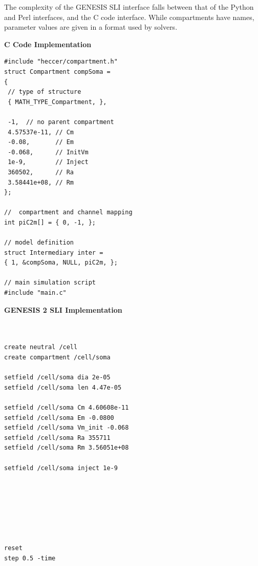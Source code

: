 \documentclass[12pt]{article}
\begin{document}
The complexity of the GENESIS SLI interface falls between that of the
Python and Perl interfaces, and the C code interface.  While compartments have
names, parameter values are given in a format used by solvers.

{\vspace*{3mm} \footnotesize
  \begin{minipage}{1\linewidth}
    
    \begin{minipage}[t]{.50\linewidth}
{\bf C Code Implementation}
\resetlinenumber
\begin{verbatim}
#include "heccer/compartment.h"
struct Compartment compSoma =
{
 // type of structure
 { MATH_TYPE_Compartment, },

 -1,  // no parent compartment
 4.57537e-11, // Cm
 -0.08,       // Em
 -0.068,      // InitVm
 1e-9,        // Inject
 360502,      // Ra
 3.58441e+08, // Rm
};

//  compartment and channel mapping
int piC2m[] = { 0, -1, };

// model definition
struct Intermediary inter =
{ 1, &compSoma, NULL, piC2m, };

// main simulation script
#include "main.c"

\end{verbatim}
    \end{minipage}
    \begin{minipage}[t]{.50\linewidth}
{\bf GENESIS 2 SLI Implementation}
\resetlinenumber
\begin{verbatim}


create neutral /cell
create compartment /cell/soma

setfield /cell/soma dia 2e-05
setfield /cell/soma len 4.47e-05

setfield /cell/soma Cm 4.60608e-11
setfield /cell/soma Em -0.0800
setfield /cell/soma Vm_init -0.068
setfield /cell/soma Ra 355711
setfield /cell/soma Rm 3.56051e+08

setfield /cell/soma inject 1e-9







reset
step 0.5 -time
\end{verbatim}
    \end{minipage}
  \end{minipage}
  \linenumbers
  \vspace*{1mm}
}
\end{document}
